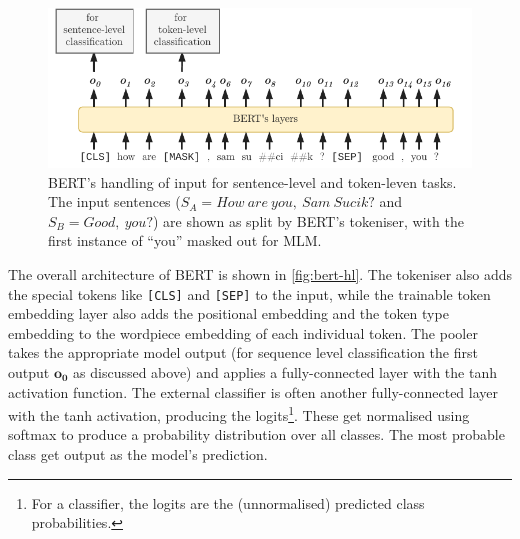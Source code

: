 \documentclass[bsc,frontabs,twoside,singlespacing,parskip,deptreport]{infthesis}
\begin{document}
{{{      \begin{figure}[h!t]
        \centering
        \includegraphics[width=14cm]{graphics/bert-inputs}
        \caption{BERT's handling of input for sentence-level and token-leven tasks. The input sentences ($S_A = How\ are\ you,\ Sam\ Sucik?$ and $S_B = Good,\ you?$) are shown as split by BERT's tokeniser, with the first instance of ``you'' masked out for MLM.}
        \label{fig:bert-inputs}
      \end{figure}
      The overall architecture of BERT is shown in \autoref{fig:bert-hl}. The tokeniser also adds the special tokens like \verb|[CLS]| and \verb|[SEP]| to the input, while the trainable token embedding layer also adds the positional embedding and the token type embedding to the wordpiece embedding of each individual token. The pooler takes the appropriate model output (for sequence level classification the first output $\bm{o_0}$ as discussed above) and applies a fully-connected layer with the tanh activation function.
      The external classifier is often another fully-connected layer with the tanh activation, producing the logits\footnote{For a classifier, the logits are the (unnormalised) predicted class probabilities.}. These get normalised using softmax to produce a probability distribution over all classes. The most probable class get output as the model's prediction.
      
}}}
\end{document}
